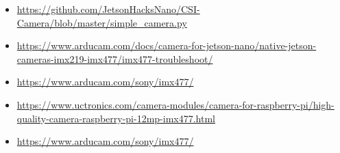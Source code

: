 \begin{itemize}
  \item \url{https://github.com/JetsonHacksNano/CSI-Camera/blob/master/simple_camera.py}
  \item \url{https://www.arducam.com/docs/camera-for-jetson-nano/native-jetson-cameras-imx219-imx477/imx477-troubleshoot/}
  \item \url{https://www.arducam.com/sony/imx477/}
  \item \url{https://www.uctronics.com/camera-modules/camera-for-raspberry-pi/high-quality-camera-raspberry-pi-12mp-imx477.html}
  \item \url{https://www.arducam.com/sony/imx477/}
\end{itemize}

